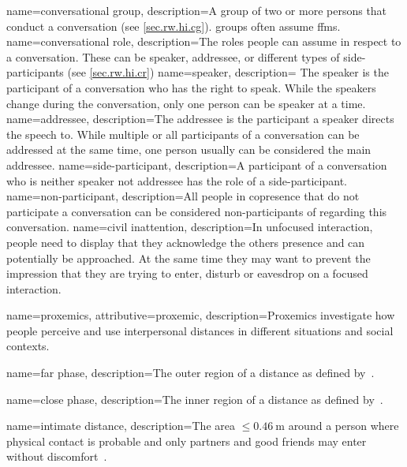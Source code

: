 {
	name={con\-ver\-sa\-tion\-al gro\-up},
	description={A group of two or more persons that conduct a \gls{conversation} (see \cref{sec.rw.hi.cg}).  groups often assume \glspl{ffm}.}
}
{
	name={conversational role},
	description={The roles people can assume in respect to a \gls{conversation}. These can be \gls{speaker}, \gls{addressee}, or different types of \glspl{side-participant} (see \cref{sec.rw.hi.cr})}
}
{
	name={speaker},
	description={
		The \gls{speaker} is the participant of a \gls{conversation} who has the right to speak.
		While the \glspl{speaker} change during the \gls{conversation}, only one person can be \gls{speaker} at a time.
		}
}
{
	name={addressee},
	description={The \gls{addressee} is the participant a \gls{speaker} directs the speech to.
	While multiple or all participants of a \gls{conversation} can be addressed at the same time, one person usually can be considered the main \gls{addressee}.}
}
{
	name={side-participant},
	description={A participant of a \gls{conversation} who is neither \gls{speaker} not \gls{addressee} has the role of a \gls{side-participant}.}
}
{
	name={non-participant},
	description={All people in \gls{copresence} that do not participate a \gls{conversation} can be considered \glspl{non-participant} of regarding this \gls{conversation}.}
}
{
	name={civil inattention},
	description={In \gls{unfocused interaction}, people need to display that they acknowledge the others presence and can potentially be approached. At the same time they may want to prevent the impression that they are trying to enter, disturb or eavesdrop on a \gls{focused interaction}.}
}

{
	name={proxemics},
	attributive={proxemic},
	description={Proxemics investigate how people perceive and use interpersonal distances in different situations and social contexts.}
}

{
	name={far phase},
	description={The outer region of a  distance as defined by~\cite{Hall1969}.}
}

{
	name={close phase},
	description={The inner region of a  distance as defined by~\cite{Hall1969}.}
}

{
	name={intimate distance},
	description={The area \(\leq\SI{0.46}{\meter}\) around a person where physical contact is probable and only partners and good friends may enter without discomfort~\cite[]{Hall1969}.}
}

